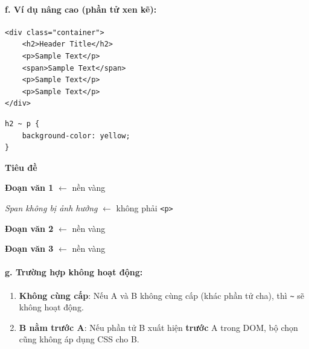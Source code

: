 \documentclass[11pt,oneside]{book}
\newcommand{\codeinline}[1]{\textcolor{accentOrange}{\texttt{#1}}}
\begin{document}
\paragraph{f. Ví dụ nâng cao (phần tử xen kẽ):}
\begin{codeWindow}
\begin{lstlisting}[language=HTML5]
<div class="container">
    <h2>Header Title</h2>
    <p>Sample Text</p>
    <span>Sample Text</span>
    <p>Sample Text</p>
    <p>Sample Text</p>
</div>
\end{lstlisting}

\begin{lstlisting}[language=CSS3]
h2 ~ p {
    background-color: yellow;
}
\end{lstlisting}
\end{codeWindow}

\begin{browserWindow}
\sffamily\small
\begin{tcolorbox}[arc=2pt, colback=primaryBlue!5, colframe=primaryBlue!40, boxrule=1pt, title={\sffamily\small\color{white}\textbf{.container}}, colbacktitle=primaryBlue!70]
{\bfseries\large\textcolor{darkText}{Tiêu đề}} \par\vspace{4pt}
\colorbox{yellow!60}{\textbf{Đoạn văn 1}} {\small\textcolor{gray!60}{$\leftarrow$ nền vàng}} \par\vspace{3pt}
\textcolor{darkText}{\textit{Span không bị ảnh hưởng}} {\small\textcolor{gray!60}{$\leftarrow$ không phải \codeinline{<p>}}} \par\vspace{3pt}
\colorbox{yellow!60}{\textbf{Đoạn văn 2}} {\small\textcolor{gray!60}{$\leftarrow$ nền vàng}} \par\vspace{3pt}
\colorbox{yellow!60}{\textbf{Đoạn văn 3}} {\small\textcolor{gray!60}{$\leftarrow$ nền vàng}}
\end{tcolorbox}
\end{browserWindow}

\paragraph{g. Trường hợp không hoạt động:}

\begin{warnBox}
\begin{enumerate}[leftmargin=1.5em, itemsep=3pt, parsep=0pt]
    \item \textbf{Không cùng cấp}: Nếu A và B không cùng cấp (khác phần tử cha), thì \codeinline{\textasciitilde{}} sẽ không hoạt động.
    \item \textbf{B nằm trước A}: Nếu phần tử B xuất hiện \textbf{trước} A trong DOM, bộ chọn cũng không áp dụng CSS cho B.
\end{enumerate}
\end{warnBox}
\end{document}
